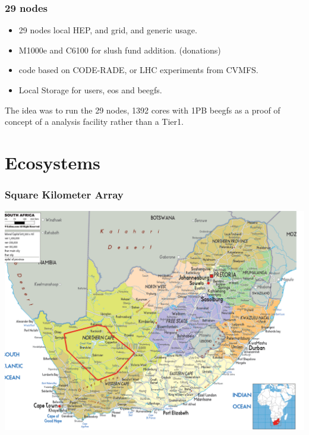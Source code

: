 \documentclass{beamer}
\begin{document}
\begin{frame}
\frametitle{29 nodes} %
\begin{itemize}
  \item 29 nodes local HEP, and grid, and generic usage.
  \item M1000e and C6100 for slush fund addition. (donations)
  \item code based on CODE-RADE, or LHC experiments from CVMFS.
  \item Local Storage for users, eos and beegfs.
\end{itemize}
The idea was to run the 29 nodes, 1392 cores with 1PB beegfs as a proof of concept of a analysis facility rather than a Tier1. 
\end{frame}

\section{Ecosystems}
\begin{frame}
    \frametitle{Square Kilometer Array}
    \includegraphics[scale=0.25]{ska-radiosilence.png}
\end{frame}
\end{document}
